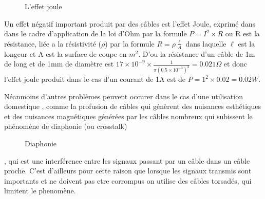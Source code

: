 \documentclass[12pt]{report}
\begin{document}
\newpage

\begin{figure}
  \begin{center}
    \setlength\fboxsep{0pt}
    \setlength\fboxrule{0.5pt}
  \end{center}
  \caption{L'effet joule}
\end{figure}Un effet négatif important produit par des câbles est l'effet Joule, exprimé dans dans le cadre d'application de la loi d'Ohm par la formule \( P=I^{2} \times R\)\cite{wiki2} ou R est la résistance, liée a la résistivité (\(\rho\)) par la formule \( R= \rho \frac{\ell}{A} \)\cite{wiki3} dans laquelle \(\ell\) est la longeur et A est la surface de coupe en \(m^2\).
D'ou la résistance d'un câble de 1m de long et de 1mm de diamètre est \(17 \times 10^{-9} \times \frac{1}{\pi (0.5 \times 10^{-3})^{2}} = 0.021 \Omega \) et donc l'effet joule produit dans le cas d'un courant de 1A est de \( P=1^{2} \times 0.02 = 0.02 W\).

	Néanmoins d'autres problèmes peuvent occurer dans le cas d'une utilisation domestique , comme la profusion de câbles qui génèrent des nuisances esthétiques et des nuisances magnétiques générées par les câbles nombreux qui subissent le phénomène de diaphonie (ou crosstalk)\cite{wiki4}
\begin{figure}
  \begin{center}
    \setlength\fboxsep{0pt}
    \setlength\fboxrule{0.5pt}
  \end{center}
  \caption{Diaphonie}
\end{figure}, qui est une interférence entre les signaux passant par un câble dans un câble proche. C'est d'ailleurs pour cette raison que lorsque les signaux transmis sont importants et ne doivent pas etre corrompus on utilise des câbles torsadés,  qui limitent le phenomène.
\end{document}
